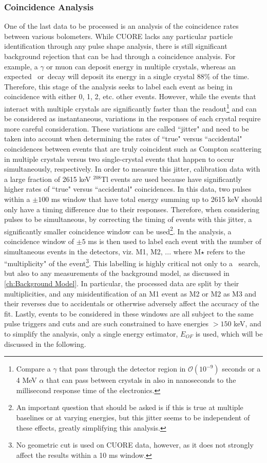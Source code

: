 \subsubsection*{Coincidence Analysis}
One of the last data to be processed is an analysis of the coincidence rates between various bolometers.
While CUORE lacks any particular particle identification through any pulse shape analysis, there is still significant background rejection that can be had through a coincidence analysis.
For example, a $\gamma$ or muon can deposit energy in multiple crystals, whereas an expected \zeronubb~or\twonubb~decay will deposit its energy in a single crystal 88\% of the time.
Therefore, this stage of the analysis seeks to label each event as being in coincidence with either 0, 1, 2, etc. other events.
However, while the events that interact with multiple crystals are significantly faster than the readout\footnote{Compare a $\gamma$ that pass through the detector region in $\mathcal{O}(10^{-9})$ seconds or a 4 MeV $\alpha$ that can pass between crystals in also in nanoseconds to the millisecond response time of the electronics.} and can be considered as instantaneous, variations in the responses of each crystal require more careful consideration.
These variations are called ``jitter" and need to be taken into account when determining the rates of ``true" versus ``accidental" coincidences between events that are truly coincident such as Compton scattering in multiple crystals versus two single-crystal events that happen to occur simultaneously, respectively.
In order to measure this jitter, calibration data with a large fraction of 2615 keV $^{208}$Tl events are used because have significantly higher rates of ``true" versus ``accidental" coincidences.
In this data, two pulses within a $\pm100$ ms window that have total energy summing up to 2615 keV should only have a timing difference due to their responses.
Therefore, when considering pulses to be simultaneous, by correcting the timing of events with this jitter, a significantly smaller coincidence window can be used\footnote{An important question that should be asked is if this is true at multiple baselines or at varying energies, but this jitter seems to be independent of these effects, greatly simplifying this analysis.}.
In the analysis, a coincidence window of $\pm5$ ms is then used to label each event with the number of simultaneous events in the detectors, viz. M1, M2, ... where M$\star$ refers to the ``multiplicity" of the event\footnote{No geometric cut is used on CUORE data, however, as it does not strongly affect the results within a 10 ms window.}.
This labelling is highly critical not only to a \zeronubb~search, but also to any measurements of the background model, as discussed in \autoref{ch:Background Model}.
In particular, the processed data are split by their multiplicities, and any misidentification of an M1 event as M2 or M2 as M3 and their reverses due to accidentals or otherwise adversely affect the accuracy of the fit. 
Lastly, events to be considered in these windows are all subject to the same pulse triggers and cuts and are such constrained to have energies $>150$ keV, and to simplify the analysis, only a single energy estimator, $E_{OF}$ is used, which will be discussed in the following.

